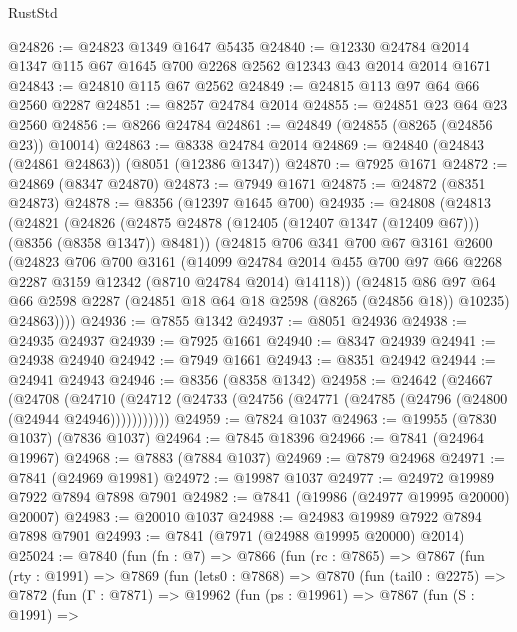 \begin{lexlean}{RustStd}
\begin{coremodule}
@24826 := @24823 @1349 @1647 @5435
@24840 := @12330 @24784 @2014 @1347 @115 @67 @1645 @700 @2268 @2562 @12343 @43 @2014 @2014 @1671
@24843 := @24810 @115 @67 @2562
@24849 := @24815 @113 @97 @64 @66 @2560 @2287
@24851 := @8257 @24784 @2014
@24855 := @24851 @23 @64 @23 @2560
@24856 := @8266 @24784
@24861 := @24849 (@24855 (@8265 (@24856 @23)) @10014)
@24863 := @8338 @24784 @2014
@24869 := @24840 (@24843 (@24861 @24863)) (@8051 (@12386 @1347))
@24870 := @7925 @1671
@24872 := @24869 (@8347 @24870)
@24873 := @7949 @1671
@24875 := @24872 (@8351 @24873)
@24878 := @8356 (@12397 @1645 @700)
@24935 := @24808
    (@24813
      (@24821
        (@24826 (@24875 @24878 (@12405 (@12407 @1347 (@12409 @67))) (@8356 (@8358 @1347)) @8481))
        (@24815
          @706
          @341
          @700
          @67
          @3161
          @2600
          (@24823
            @706
            @700
            @3161
            (@14099
              @24784
              @2014
              @455
              @700
              @97
              @66
              @2268
              @2287
              @3159
              @12342
              (@8710 @24784 @2014)
              @14118))
          (@24815
            @86
            @97
            @64
            @66
            @2598
            @2287
            (@24851 @18 @64 @18 @2598 (@8265 (@24856 @18)) @10235)
            @24863))))
@24936 := @7855 @1342
@24937 := @8051 @24936
@24938 := @24935 @24937
@24939 := @7925 @1661
@24940 := @8347 @24939
@24941 := @24938 @24940
@24942 := @7949 @1661
@24943 := @8351 @24942
@24944 := @24941 @24943
@24946 := @8356 (@8358 @1342)
@24958 := @24642
    (@24667
      (@24708
        (@24710 (@24712 (@24733 (@24756 (@24771 (@24785 (@24796 (@24800 (@24944 @24946)))))))))))
@24959 := @7824 @1037
@24963 := @19955 (@7830 @1037) (@7836 @1037)
@24964 := @7845 @18396
@24966 := @7841 (@24964 @19967)
@24968 := @7883 (@7884 @1037)
@24969 := @7879 @24968
@24971 := @7841 (@24969 @19981)
@24972 := @19987 @1037
@24977 := @24972 @19989 @7922 @7894 @7898 @7901
@24982 := @7841 (@19986 (@24977 @19995 @20000) @20007)
@24983 := @20010 @1037
@24988 := @24983 @19989 @7922 @7894 @7898 @7901
@24993 := @7841 (@7971 (@24988 @19995 @20000) @2014)
@25024 := @7840
    (fun (fn : @7) =>
    @7866
      (fun (rc : @7865) =>
      @7867
        (fun (rty : @1991) =>
        @7869
          (fun (lets0 : @7868) =>
          @7870
            (fun (tail0 : @2275) =>
            @7872
              (fun (Γ : @7871) =>
              @19962
                (fun (ps : @19961) =>
                @7867
                  (fun (S : @1991) =>

\end{coremodule}
\end{lexlean}

